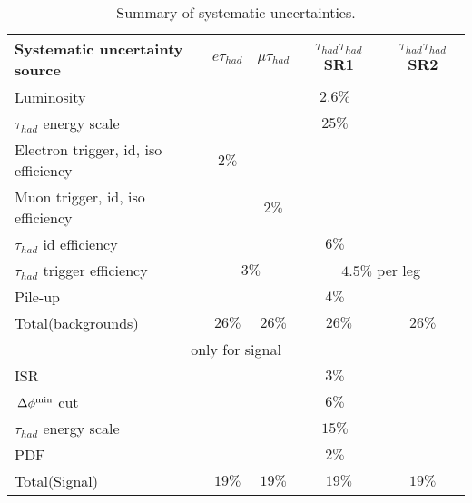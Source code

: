 \begin{table}[!h]
\begin{center}
\small{
\begin{tabular}{|l|c|c|c|c|}
\hline\hline
Systematic uncertainty source & $e\tau_{had}$ & $\mu\tau_{had}$ & $\tau_{had}\tau_{had}$ SR1 & $\tau_{had}\tau_{had}$ SR2\\
\hline\hline
{Luminosity}&\multicolumn{4}{c|}{$2.6\%$} \\\hline
{$\tau_{had}$ energy scale}&\multicolumn{4}{c|}{$25\%$} \\\hline
{Electron trigger, id, iso efficiency}& $2\%$ & \multicolumn{3}{c|}{} \\\hline
{Muon trigger, id, iso efficiency}& &$2\%$ & \multicolumn{2}{c|}{} \\\hline
{$\tau_{had}$ id efficiency}& \multicolumn{4}{c|}{$6\%$} \\\hline
{$\tau_{had}$ trigger efficiency}& \multicolumn{2}{c|}{$3\%$}&\multicolumn{2}{c|}{$4.5\%$ per leg} \\\hline
{Pile-up}&\multicolumn{4}{c|}{$4\%$} \\\hline
Total(backgrounds) & $26\%$ & $26\%$ & $26\%$  & $26\%$\\\hline
\multicolumn{5}{|c|}{only for signal} \\\hline
{ISR}&\multicolumn{4}{c|}{$3\%$} \\\hline
{$\,{\Delta\phi^{\rm min}}$ cut}&\multicolumn{4}{c|}{$6\%$} \\\hline
{$\tau_{had}$ energy scale}&\multicolumn{4}{c|}{$15\%$} \\\hline
{PDF}&\multicolumn{4}{c|}{$2\%$} \\\hline
Total(Signal) & $19\%$ & $19\%$ & $19\%$  & $19\%$\\
\hline
\hline
\end{tabular}
}
\end{center}
\caption{
  Summary of systematic uncertainties.
}
\label{Tab.SYS}
\end{table}
